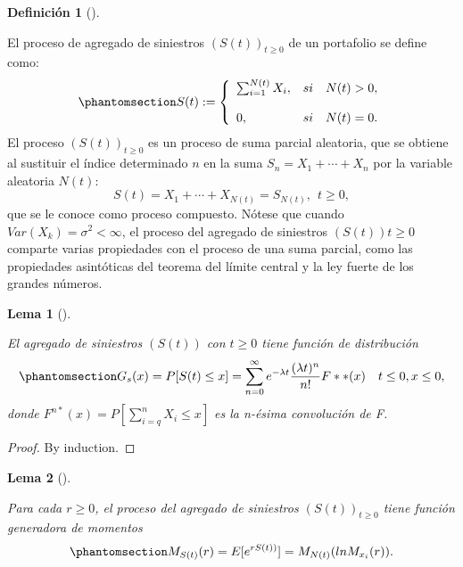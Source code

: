 \documentclass[
  us-letterpaper,
]{scrreprt}
\theoremstyle{plain}
\newtheorem{lemma}{Lema}[chapter]
\theoremstyle{plain}
\theoremstyle{definition}
\newtheorem{definition}{Definición}[chapter]
\theoremstyle{remark}
\begin{document}
\begin{definition}[]\protect\hypertarget{def-2}{}\label{def-2}

El proceso de agregado de siniestros \((S(t))_{t \geq 0}\) de un
portafolio se define como:
\begin{equation}\phantomsection\label{eq-1.2}{S(t):= \left\{ \begin{array}{lcc} \sum_{i=1}^{N(t)} X_i, & si & N(t) > 0, \\ \\ 
0, & si & N(t) = 0. \end{array} \right. }\end{equation} El proceso
\((S(t))_{t\geq0}\) es un proceso de suma parcial aleatoria, que se
obtiene al sustituir el índice determinado \(n\) en la suma
\(S_n = X_1 + \dotsb + X_n\) por la variable aleatoria \(N(t):\)
\[S(t) = X_1 + \dotsb+ X_{N(t)} = S_{N(t)}, \ \ t\geq0,\]que se le
conoce como proceso compuesto. Nótese que cuando
\(Var(X_k) = \sigma^2 < \infty\), el proceso del agregado de siniestros
\((S(t))t\ge0\) comparte varias propiedades con el proceso de una suma
parcial, como las propiedades asintóticas del teorema del límite central
y la ley fuerte de los grandes números.

\end{definition}

\begin{lemma}[]\protect\hypertarget{lem-1}{}\label{lem-1}

El agregado de siniestros \((S(t))\) con \(t \geq 0\) tiene función de
distribución
\begin{equation}\phantomsection\label{eq-1.3}{G_s(x) = P[S(t) \leq x] = \sum_{n=0}^{\infty} e^{-\lambda t}\frac{(\lambda t)^n}{n!}F**(x) \ \ \ t\leq 0, x \leq 0,}\end{equation}
donde \(F^{n*}(x)= P[\sum_{i=q}^{n} X_i \leq x]\) es la n-ésima
convolución de F.

\end{lemma}

\begin{proof}
By induction.
\end{proof}

\begin{lemma}[]\protect\hypertarget{lem-2}{}\label{lem-2}

Para cada \(r \geq 0\), el proceso del agregado de siniestros
\((S(t))_{t \geq 0}\) tiene función generadora de momentos
\begin{equation}\phantomsection\label{eq-1.5}{M_{S(t)}(r) = E[e^{rS(t))}] = M_{N(t)}(ln M_{x_i}(r)).}\end{equation}

\end{lemma}
\end{document}
